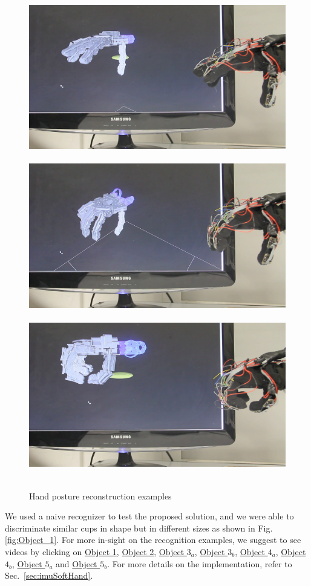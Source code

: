 \documentclass[a4paper,11pt,pdf]{pacmanreport}
\begin{document}
\begin{figure}
\centering
\mbox{
\includegraphics[width=0.33\linewidth]{Hand_Movement_1.png}
\includegraphics[width=0.33\linewidth]{Hand_Movement_2.png}
\includegraphics[width=0.33\linewidth]{Hand_Movement_3.png}
}
\caption{Hand posture reconstruction examples}
\label{fig:hand_reconstruction_1}
\end{figure}

We used a naive recognizer to test the proposed solution, and we were able to discriminate similar cups in shape but in different sizes as shown in Fig. \ref{fig:Object_1}. For more in-sight on the recognition examples, we suggest to see videos by clicking on \href{https://www.youtube.com/watch?v=d_WPQ3WmHRg}{Object 1}, \href{https://www.youtube.com/watch?v=PG38VObdl6o}{Object 2}, \href{https://www.youtube.com/watch?v=bIYhLXm90hc}{Object $3_a$}, \href{https://www.youtube.com/watch?v=IXVlBAoGKho}{Object $3_b$}, \href{https://www.youtube.com/watch?v=Efmm6-JHcxU}{Object $4_a$}, \href{https://www.youtube.com/watch?v=NZElSV_AnJ4}{Object $4_b$}, \href{https://www.youtube.com/watch?v=mDDb5oTaHzM}{Object $5_a$} and \href{https://www.youtube.com/watch?v=sLzU39zffFY}{Object $5_b$}. For more details on the implementation, refer to Sec.~\ref{sec:imuSoftHand}.
\end{document}
